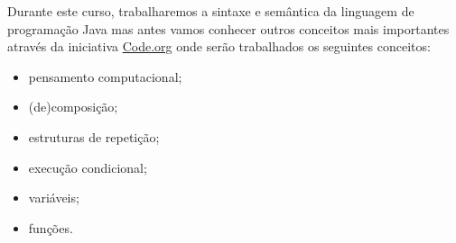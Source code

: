 \documentclass[justified]{tufte-handout}
\begin{document}
Durante este curso, trabalharemos a sintaxe e semântica da linguagem de programação Java mas antes vamos conhecer outros conceitos mais importantes através da iniciativa \url{Code.org} onde serão trabalhados os seguintes conceitos:

\begin{itemize}
	\item pensamento computacional;
	\item (de)composição;
	\item estruturas de repetição;
	\item execução condicional;
	\item variáveis;
	\item funções.
\end{itemize}
\end{document}
